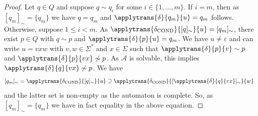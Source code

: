 \begin{proof}
  Let $q \in Q$
 and suppose $q \sim q_i$ for some $i \in \{1,\ldots,m\}$. 
 If $i = m$, then 
 as $[q_m]_{\sim} = \{q_m\}$ we have $q = q_m$
 and $\applytrans{\delta}{q_m}{u} = q_m$ follows.
 Otherwise, suppose $1 \le i < m$.
 As $\applytrans{\delta_{\text{COND}}}{[q]_{\sim}}{u} = [q_m]_{\sim}$,
 there exist $p \in Q$
 with $q \sim p$ and $\applytrans{\delta}{p}{u} = q_m$.
 We have $u \ne \varepsilon$ and can write $u = vxw$ with $v,w \in \Sigma^*$
 and $x \in \Sigma$
 such that $\applytrans{\delta}{p}{v} \sim p$
 and $\applytrans{\delta}{p}{vx} \not\sim p$.
 As $\mathcal A$ is solvable, 
 this implies $\applytrans{\delta}{q}{vx} \not\sim p$.
 We have 
 \[
  [q_m]_{\sim} = \applytrans{\delta_{\text{COND}}}{[q]_{\sim}}{u}
  \supseteq \applytrans{\delta_{\text{COND}}}{[\applytrans{\delta}{q}{vx}]_{\sim}}{w}
 \]
 and the latter set is non-empty as the automaton is complete.
 So, as $[q_m]_{\sim} = \{q_m\}$ we have in fact equality in the above equation.
 
 
 
 
 
 
 
 
 
 
 
 
 
 
 
 
 
 
 
\end{proof}








 
